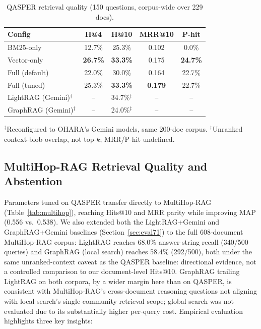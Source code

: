 \documentclass[conference,a4paper]{IEEEtran}
\begin{document}
\begin{table}[t]
\centering
\caption{QASPER retrieval quality (150 questions, corpus-wide over 229 docs).}
\label{tab:qasper}
\scriptsize
\setlength{\tabcolsep}{3pt}
\begin{tabular}{lcccc}
\toprule
Config & H@4 & H@10 & MRR@10 & P-hit \\
\midrule
BM25-only & 12.7\% & 25.3\% & 0.102 & 0.0\% \\
Vector-only & \textbf{26.7\%} & \textbf{33.3\%} & 0.175 & \textbf{24.7\%} \\
Full (default) & 22.0\% & 30.0\% & 0.164 & 22.7\% \\
Full (tuned) & 25.3\% & \textbf{33.3\%} & \textbf{0.179} & 22.7\% \\
LightRAG (Gemini)$^\dagger$ & -- & 34.7\%$^\ddagger$ & -- & -- \\
GraphRAG (Gemini)$^\dagger$ & -- & 24.0\%$^\ddagger$ & -- & -- \\
\bottomrule
\end{tabular}
\vspace{2pt}
\footnotesize{$^\dagger$Reconfigured to OHARA's Gemini models, same 200-doc corpus. $^\ddagger$Unranked context-blob overlap, not top-$k$; MRR/P-hit undefined.}
\end{table}

\subsection{MultiHop-RAG Retrieval Quality and Abstention}

Parameters tuned on QASPER transfer directly to MultiHop-RAG (Table~\ref{tab:multihop}), reaching Hits@10 and MRR parity while improving MAP (0.556 vs.\ 0.538). We also extended both the LightRAG+Gemini and GraphRAG+Gemini baselines (Section~\ref{sec:eval71}) to the full 608-document MultiHop-RAG corpus: LightRAG reaches 68.0\% answer-string recall (340/500 queries) and GraphRAG (local search) reaches 58.4\% (292/500), both under the same unranked-context caveat as the QASPER baseline: directional evidence, not a controlled comparison to our document-level Hits@10. GraphRAG trailing LightRAG on both corpora, by a wider margin here than on QASPER, is consistent with MultiHop-RAG's cross-document reasoning questions not aligning with local search's single-community retrieval scope; global search was not evaluated due to its substantially higher per-query cost. Empirical evaluation highlights three key insights:
\end{document}
